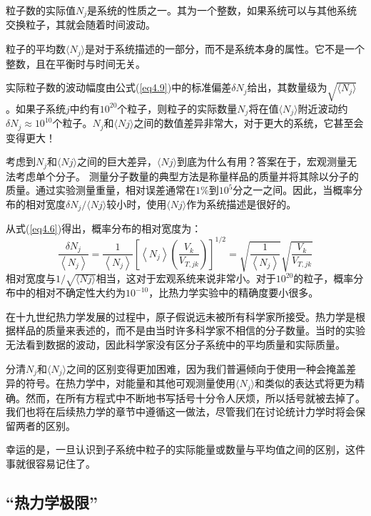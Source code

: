 \documentclass[UTF8]{ctexart}
\numberwithin{equation}{section}%
\numberwithin{figure}{section}%
\begin{document}
    粒子数的实际值$N_j$是系统的性质之一。其为一个整数，如果系统可以与其他系统交换粒子，其就会随着时间波动。

    粒子的平均数$\langle{N_j}\rangle$是对于系统描述的一部分，而不是系统本身的属性。它不是一个整数，且在平衡时与时间无关。

    实际粒子数的波动幅度由公式(\ref{eq4.9})中的标准偏差$δN_j$给出，其数量级为$\sqrt{\langle{N_j}\rangle}$。如果子系统$j$中约有$10^{20}$个粒子，则粒子的实际数量$N_j$将在值$\langle{N_j}\rangle$附近波动约$\delta N_j\approx 10^{10}$个粒子。$N_j$和$\langle{Nj}\rangle$之间的数值差异非常大，对于更大的系统，它甚至会变得更大！

    考虑到$N_j$和$\langle{Nj}\rangle$之间的巨大差异，$\langle{Nj}\rangle$到底为什么有用？答案在于，宏观测量无法考虑单个分子。
    测量分子数量的典型方法是称量样品的质量并将其除以分子的质量。通过实验测量重量，相对误差通常在$1\%$到$10^5$分之一之间。因此，当概率分布的相对宽度$δN_j/\langle{Nj}\rangle$较小时，使用$\langle{Nj}\rangle$作为系统描述是很好的。

    从式(\ref{eq4.6})得出，概率分布的相对宽度为：
    \begin{equation}
        \frac{\delta N_{j}}{\left\langle N_{j}\right\rangle}=\frac{1}{\left\langle N_{j}\right\rangle}\left[\left\langle N_{j}\right\rangle\left(\frac{V_{k}}{V_{T, j k}}\right)\right]^{1 / 2}=\sqrt{\frac{1}{\left\langle N_{j}\right\rangle}} \sqrt{\frac{V_{k}}{V_{T, j k}}}
    \end{equation}
    相对宽度与$1/\sqrt{\langle{Nj}\rangle}$相当，这对于宏观系统来说非常小。对于$10^{20}$的粒子，概率分布中的相对不确定性大约为$10^{-10}$，比热力学实验中的精确度要小很多。

    在十九世纪热力学发展的过程中，原子假说远未被所有科学家所接受。热力学是根据样品的质量来表述的，而不是由当时许多科学家不相信的分子数量。当时的实验无法看到数据的波动，因此科学家没有区分子系统中的平均质量和实际质量。

    分清$N_j$和$\langle{N_j}\rangle$之间的区别变得更加困难，因为我们普遍倾向于使用一种会掩盖差异的符号。在热力学中，对能量和其他可观测量使用$\langle{N_j}\rangle$和类似的表达式将更为精确。然而，在所有方程式中不断地书写括号十分令人厌烦，所以括号就被去掉了。我们也将在后续热力学的章节中遵循这一做法，尽管我们在讨论统计力学时将会保留两者的区别。

    幸运的是，一旦认识到子系统中粒子的实际能量或数量与平均值之间的区别，这件事就很容易记住了。

    \subsection{“热力学极限”}
\end{document}
